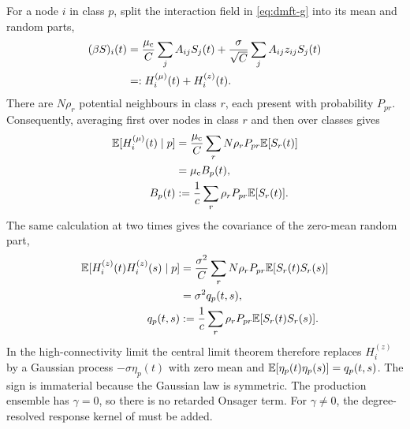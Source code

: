 For a node $i$ in class $p$, split the interaction field in \eqref{eq:dmft-g} into its mean and
random parts,
\begin{align}
    (\beta S)_i(t)
      &=\frac{\mu_{\rm c}}{C}\sum_jA_{ij}S_j(t)
        +\frac{\sigma}{\sqrt C}\sum_jA_{ij}z_{ij}S_j(t)
        \nonumber\\
      &=:H_i^{(\mu)}(t)+H_i^{(z)}(t).
    \label{eq:dmft-field-split}
\end{align}
There are $N\rho_r$ potential neighbours in class $r$, each present with probability $P_{pr}$.
Consequently, averaging first over nodes in class $r$ and then over classes gives
\begin{align}
    \mathbb{E}[H_i^{(\mu)}(t)\mid p]
      &=\frac{\mu_{\rm c}}{C}
        \sum_rN\rho_rP_{pr}\mathbb{E}[S_r(t)]\nonumber\\
      &=\mu_{\rm c}B_p(t),
    \label{eq:dmft-mean-field-step}\\
    B_p(t)&:=\frac1c\sum_r\rho_rP_{pr}\mathbb{E}[S_r(t)].
    \label{eq:dmft-B}
\end{align}
The same calculation at two times gives the covariance of the zero-mean random part,
\begin{align}
    \mathbb{E}[H_i^{(z)}(t)H_i^{(z)}(s)\mid p]
      &=\frac{\sigma^2}{C}\sum_rN\rho_rP_{pr}
          \mathbb{E}[S_r(t)S_r(s)]\nonumber\\
      &=\sigma^2q_p(t,s),
    \label{eq:dmft-noise-cov-step}\\
    q_p(t,s)&:=\frac1c\sum_r\rho_rP_{pr}\mathbb{E}[S_r(t)S_r(s)].
    \label{eq:dmft-q}
\end{align}
In the high-connectivity limit the central limit theorem therefore replaces $H_i^{(z)}$ by a
Gaussian process $-\sigma\eta_p(t)$ with zero mean and
$\mathbb{E}[\eta_p(t)\eta_p(s)]=q_p(t,s)$.  The sign is immaterial because the Gaussian law is
symmetric.  The production ensemble has $\gamma=0$, so there is no retarded Onsager term.
For $\gamma\ne0$, the degree-resolved response kernel of \citet{aguirrelopez} must be added.

